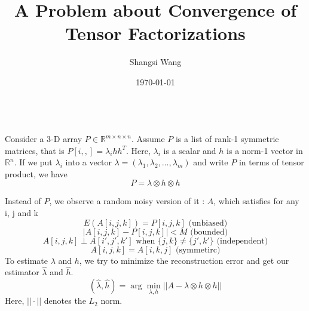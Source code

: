 \documentclass[a4paper]{article}
\title{A Problem about Convergence of Tensor Factorizations}
\author{Shangsi Wang}
\date{\today}
\begin{document}
\maketitle





 \\
Consider a 3-D array $P \in \mathbb{R}^{m \times n \times n}$. Assume $P$ is a list of rank-1 symmetric matrices, that is $P[i,,]=\lambda_i hh^T$. Here, $\lambda_i$ is a scalar and $h$ is a norm-1 vector in $\mathbb{R}^n$. If we put $\lambda_i$ into a vector $\lambda=(\lambda_1,\lambda_2,...,\lambda_m)$ and write $P$ in terms of tensor product, we have
\[P=\lambda \otimes h \otimes h \]

\noindent Instead of $P$, we observe a random noisy version of it :  $A$, which satisfies for any i, j and k
\[E(A[i,j,k]) = P[i,j,k]  \text{ (unbiased)} \] 
\[ |A[i,j,k]-P[i,j,k]|<M \text{ (bounded)} \]
\[ A[i,j,k] \perp A[i',j',k'] \text{ when $\{j,k\} \neq \{j',k'\}$}  \text{ (independent)} \]
\[A[i,j,k]=A[i,k,j]   \text{ (symmetirc)}\]
To estimate $\lambda$ and $h$, we try to minimize the reconstruction error and get our estimator $\hat{\lambda}$ and $\hat{h}$.
\[(\hat{\lambda},\hat{h}) = \arg\min_{\lambda,h} ||A- \lambda \otimes h \otimes h|| \]
Here, $|| \cdot ||$ denotes the $L_2$ norm. \\
\end{document}
